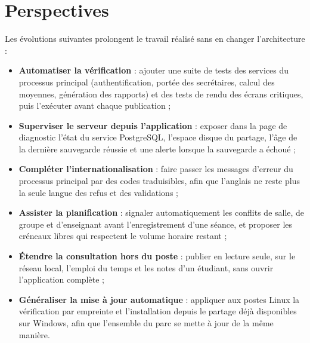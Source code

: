 \chapter*{Perspectives}

Les évolutions suivantes prolongent le travail réalisé sans en changer l'architecture :
\begin{itemize}
    \item \textbf{Automatiser la vérification} : ajouter une suite de tests des services du processus
          principal (authentification, portée des secrétaires, calcul des moyennes, génération des
          rapports) et des tests de rendu des écrans critiques, puis l'exécuter avant chaque
          publication ;
    \item \textbf{Superviser le serveur depuis l'application} : exposer dans la page de diagnostic
          l'état du service PostgreSQL, l'espace disque du partage, l'âge de la dernière sauvegarde
          réussie et une alerte lorsque la sauvegarde a échoué ;
    \item \textbf{Compléter l'internationalisation} : faire passer les messages d'erreur du processus
          principal par des codes traduisibles, afin que l'anglais ne reste plus la seule langue des
          refus et des validations ;
    \item \textbf{Assister la planification} : signaler automatiquement les conflits de salle, de
          groupe et d'enseignant avant l'enregistrement d'une séance, et proposer les créneaux libres
          qui respectent le volume horaire restant ;
    \item \textbf{Étendre la consultation hors du poste} : publier en lecture seule, sur le réseau
          local, l'emploi du temps et les notes d'un étudiant, sans ouvrir l'application complète ;
    \item \textbf{Généraliser la mise à jour automatique} : appliquer aux postes Linux la vérification
          par empreinte et l'installation depuis le partage déjà disponibles sur Windows, afin que
          l'ensemble du parc se mette à jour de la même manière.
\end{itemize}
